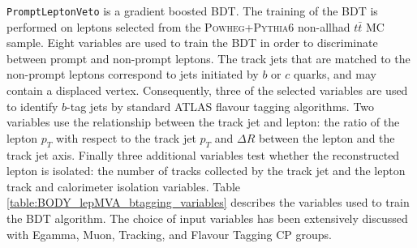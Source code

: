 \texttt{PromptLeptonVeto} is a gradient boosted BDT. The training of the BDT is performed on leptons selected from the \textsc{Powheg+Pythia6} non-allhad $t\bar{t}$ MC sample. Eight variables are used to train the BDT in order to discriminate between prompt and non-prompt leptons. The track jets that are matched to the non-prompt leptons correspond to jets initiated by $b$ or $c$ quarks, and may contain a displaced vertex. Consequently, three of the selected variables are used to identify $b$-tag jets by standard ATLAS flavour tagging algorithms. Two variables use the relationship between the track jet and lepton: the ratio of the lepton $p_{T}$ with respect to the track jet $p_{T}$ and $\Delta R$ between the lepton and the track jet axis.  Finally three additional variables test whether the reconstructed lepton is isolated: the number of tracks collected by the track jet and the lepton track and calorimeter isolation variables. Table \ref{table:BODY_lepMVA_btagging_variables} describes the variables used to train the BDT algorithm. The choice of input variables has been extensively discussed with Egamma, Muon, Tracking, and Flavour Tagging CP groups.

